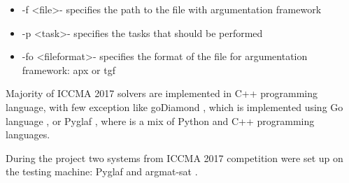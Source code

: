 \begin{itemize}
	\item -f \textless file\textgreater - specifies the path to the file with argumentation framework
	\item -p \textless task\textgreater - specifies the tasks that should be performed
	\item -fo \textless fileformat\textgreater - specifies the format of the file for argumentation framework: apx or tgf
\end{itemize}

Majority of ICCMA 2017 solvers are implemented in C++ programming language, with few exception like goDiamond \citep{goDiamond}, which is implemented using Go language \citep{GoLang}, or Pyglaf \citep{pyglaf}, where is a mix of Python and C++ programming languages. 

During the project two systems from ICCMA 2017 competition were set up on the testing machine: Pyglaf \citep{pyglaf} and argmat-sat \citep{argmatSat}.